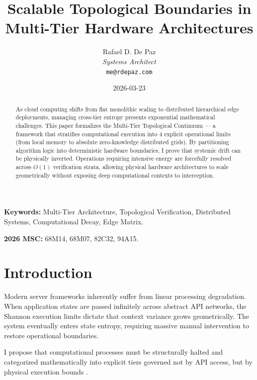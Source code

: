 \documentclass[12pt, a4paper]{article}
\theoremstyle{plain}
\theoremstyle{definition}
\begin{document}
\title{\textbf{Scalable Topological Boundaries in Multi-Tier Hardware Architectures}}
\author{Rafael D. De Paz \\ \textit{Systems Architect} \\ \texttt{me@rdepaz.com}}
\date{2026-03-23}
\maketitle

\begin{abstract}
As cloud computing shifts from flat monolithic scaling to distributed hierarchical edge deployments, managing cross-tier entropy presents exponential mathematical challenges. This paper formalizes the Multi-Tier Topological Continuum — a framework that stratifies computational execution into 4 explicit operational limits (from local memory to absolute zero-knowledge distributed grids). By partitioning algorithm logic into deterministic hardware boundaries, I prove that systemic drift can be physically inverted. Operations requiring intensive energy are forcefully resolved across $O(1)$ verification strata, allowing physical hardware architectures to scale geometrically without exposing deep computational contexts to interception.
\end{abstract}

\vspace{0.5em}
\noindent\textbf{Keywords:} Multi-Tier Architecture, Topological Verification, Distributed Systems, Computational Decay, Edge Matrix.

\vspace{0.5em}
\noindent\textbf{2026 MSC:} 68M14, 68M07, 82C32, 94A15.

\section{Introduction}
Modern server frameworks inherently suffer from linear processing degradation. When application states are passed infinitely across abstract API networks, the Shannon execution limits \cite{shannon1948mathematical} dictate that context variance grows geometrically. The system eventually enters state entropy, requiring massive manual intervention to restore operational boundaries. 

I propose that computational processes must be structurally halted and categorized mathematically into explicit tiers governed not by API access, but by physical execution bounds \cite{lamport1978time}.
\end{document}
